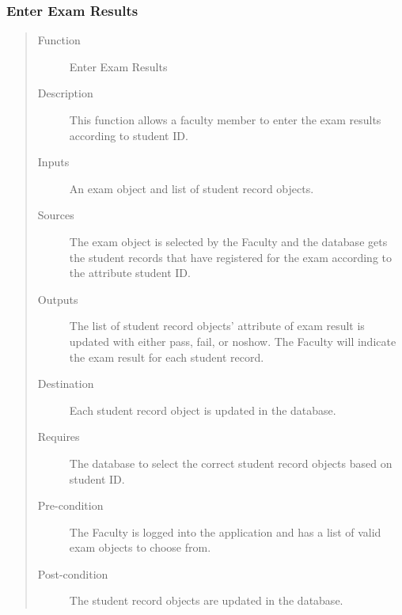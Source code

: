 \subsubsection{Enter Exam Results} 
\begin{quote} %
\begin{description}
\item[Function]
   Enter Exam Results
\item[Description]
   This function allows a faculty member to enter the exam results
   according to student ID.
\item[Inputs]
   An exam object and list of student record objects.
\item[Sources]
   The exam object is selected by the Faculty and the database gets the student
   records that have registered for the exam according to the attribute
   student ID.
\item[Outputs]
   The list of student record objects' attribute of exam result is updated with
   either pass, fail, or noshow. The Faculty will indicate the exam result for each
   student record.
\item[Destination]
   Each student record object is updated in the database.
\item[Requires]
   The database to select the correct student record objects based on student ID.
\item[Pre-condition]
   The Faculty is logged into the application and has a list of valid exam objects
   to choose from.
\item[Post-condition]
   The student record objects are updated in the database.
\end{description}
\end{quote} %

